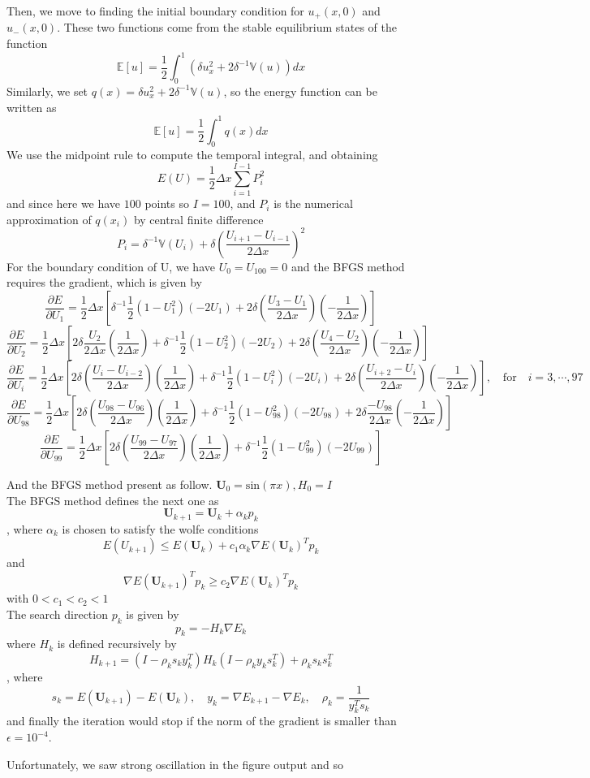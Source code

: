 \documentclass{article}
\begin{document}
\noindent
Then, we move to finding the initial boundary condition for $u_+(x,0)$ and $u_-(x,0)$.
These two functions come from the stable equilibrium states of the function$$\mathbb{E}[u] = \frac{1}{2}\int_{0}^{1}(\delta u_x^2 + 2\delta^{-1}\mathbb{V}(u))dx$$
Similarly, we set $q(x) = \delta u_x^2 + 2\delta^{-1}\mathbb{V}(u)$, so the energy function can be written as $$\mathbb{E}[u] = \frac{1}{2}\int_{0}^{1}q(x)dx$$
We use the midpoint rule to compute the temporal integral, and obtaining $$E(U) = \frac{1}{2}\Delta x\sum_{i=1}^{I-1}P_i^2$$ and since here we have $100$ points so $I = 100$, and $P_i$ is the numerical approximation of $q(x_i)$ by central finite difference$$P_i = \delta^{-1}\mathbb{V}(U_i) + \delta (\frac{U_{i+1} - U_{i-1}}{2\Delta x})^2$$
For the boundary condition of U, we have $U_0 = U_{100} = 0$ and the BFGS method requires the gradient, which is given by
\[
\frac{\partial E}{\partial U_1} = \frac{1}{2}\Delta x\left[\delta^{-1}\frac{1}{2}(1-U_1^2)(-2U_1) + 2\delta(\frac{U_3 - U_1}{2\Delta x})(-\frac{1}{2\Delta x})\right]
\]
\[
\frac{\partial E}{\partial U_2} = \frac{1}{2}\Delta x\left[2\delta\frac{U_2}{2\Delta x}(\frac{1}{2\Delta x})+\delta^{-1}\frac{1}{2}(1 - U_2^2)(-2U_2) + 2\delta(\frac{U_4 - U_2}{2\Delta x})(-\frac{1}{2\Delta x})\right]
\]
\[
\frac{\partial E}{\partial U_i} = \frac{1}{2}\Delta x\left[2\delta(\frac{U_i - U_{i-2}}{2\Delta x})(\frac{1}{2\Delta x})+\delta^{-1}\frac{1}{2}(1 - U_i^2)(-2U_i) + 2\delta(\frac{U_{i+2} - U_i}{2\Delta x})(-\frac{1}{2\Delta x})\right], \quad \text{for} \quad i = 3,\cdots,97
\]
\[
\frac{\partial E}{\partial U_{98}} = \frac{1}{2}\Delta x\left[2\delta(\frac{U_{98} - U_{96}}{2\Delta x})(\frac{1}{2\Delta x}) + \delta^{-1}\frac{1}{2}(1 - U_{98}^2)(-2U_{98}) + 2\delta\frac{-U_{98}}{2\Delta x}(-\frac{1}{2\Delta x})\right]
\]
\[
\frac{\partial E}{\partial U_{99}} = \frac{1}{2}\Delta x\left[2\delta(\frac{U_{99} - U_{97}}{2\Delta x})(\frac{1}{2\Delta x}) + \delta^{-1}\frac{1}{2}(1 - U_{99}^2)(-2U_{99})\right]
\]

\noindent
And the BFGS method present as follow.
$\textbf{U}_0 = \text{sin}(\pi x), H_0 = I$\\
The BFGS method defines the next one as $$\textbf{U}_{k+1} =\textbf{U}_k + \alpha_k p_k$$, where $\alpha_k$ is chosen to satisfy the wolfe conditions
\[
E(U_{k+1}) \leq E(\textbf{U}_k) + c_1 \alpha_k \nabla E(\textbf{U}_k)^T p_k
\]
and 
\[
\nabla E(\textbf{U}_{k+1})^T p_k \geq c_2 \nabla E(\textbf{U}_k)^T p_k
\]
with $0 < c_1 < c_2 < 1$\\
The search direction $p_k$ is given by $$p_k = -H_k\nabla E_k$$
where $H_k$ is defined recursively by $$H_{k+1} = (I -\rho_k s_k y_k^T)H_k(I - \rho_k y_k s_k^T)+\rho_ks_ks_k^T$$, where $$s_k = E(\textbf{U}_{k+1}) - E(\textbf{U}_k),\quad y_k = \nabla E_{k+1} - \nabla E_k, \quad \rho_k = \frac{1}{y_k^Ts_k}$$
and finally the iteration would stop if the norm of the gradient is smaller than $\epsilon = 10^{-4}$.

\vspace{1em}
\noindent
Unfortunately, we saw strong oscillation in the figure output and so 
\end{document}
